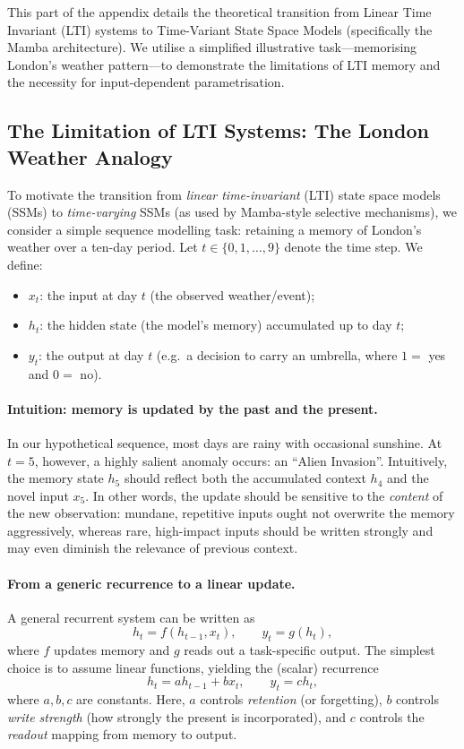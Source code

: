 \documentclass[a4paper,11pt]{article}
\begin{document}
This part of the appendix details the theoretical transition from Linear Time Invariant (LTI) systems to Time-Variant State Space Models (specifically the Mamba architecture). We utilise a simplified illustrative task—memorising London's weather pattern—to demonstrate the limitations of LTI memory and the necessity for input-dependent parametrisation.

\subsection{The Limitation of LTI Systems: The London Weather Analogy}
\label{app:lti-london-weather}

To motivate the transition from \emph{linear time-invariant} (LTI) state space models (SSMs) to \emph{time-varying} SSMs (as used by Mamba-style selective mechanisms), we consider a simple sequence modelling task: retaining a memory of London's weather over a ten-day period. Let $t \in \{0,1,\dots,9\}$ denote the time step. We define:
\begin{itemize}
    \item $x_t$: the input at day $t$ (the observed weather/event);
    \item $h_t$: the hidden state (the model's memory) accumulated up to day $t$;
    \item $y_t$: the output at day $t$ (e.g.\ a decision to carry an umbrella, where $1=$ yes and $0=$ no).
\end{itemize}

\paragraph{Intuition: memory is updated by the past and the present.}
In our hypothetical sequence, most days are rainy with occasional sunshine. At $t=5$, however, a highly salient anomaly occurs: an ``Alien Invasion''. Intuitively, the memory state $h_5$ should reflect both the accumulated context $h_4$ and the novel input $x_5$. In other words, the update should be sensitive to the \emph{content} of the new observation: mundane, repetitive inputs ought not overwrite the memory aggressively, whereas rare, high-impact inputs should be written strongly and may even diminish the relevance of previous context.

\paragraph{From a generic recurrence to a linear update.}
A general recurrent system can be written as
\begin{equation}
    h_t = f(h_{t-1}, x_t), \qquad y_t = g(h_t),
\end{equation}
where $f$ updates memory and $g$ reads out a task-specific output. The simplest choice is to assume linear functions, yielding the (scalar) recurrence
\begin{equation}
    h_t = a h_{t-1} + b x_t, 
    \qquad 
    y_t = c h_t,
\end{equation}
where $a,b,c$ are constants. Here, $a$ controls \emph{retention} (or forgetting), $b$ controls \emph{write strength} (how strongly the present is incorporated), and $c$ controls the \emph{readout} mapping from memory to output.
\end{document}
